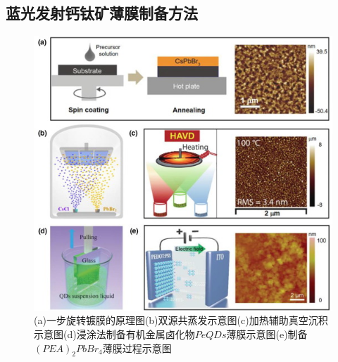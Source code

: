 \documentclass{beamer}[fontset=windows]
\begin{document}
\subsection{蓝光发射钙钛矿薄膜制备方法}
\begin{frame}
	\begin{figure}[H]
		\centering
		\hspace{2em}\includegraphics[width=.6\linewidth]{pic/7.jpg}
		\caption{(a)一步旋转镀膜的原理图(b)双源共蒸发示意图(c)加热辅助真空沉积示意图(d)浸涂法制备有机金属卤化物$PeQDs$薄膜示意图(e)制备$(PEA)_{2}PbBr_{4}$薄膜过程示意图\cite{zhang2021blue}
		}
	\end{figure}
\end{frame}
\end{document}
